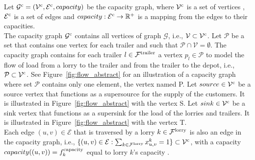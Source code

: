 Let
$\mathcal G^{\rm c} = ( \mathcal V^{\rm c},\mathcal E^{\rm c}, capacity)$
be the capacity graph, where
$\mathcal V^{\rm c}$
is a set of vertices ,
$\mathcal E^{\rm c}$
is a set of edges
and
$capacity : \mathcal E^{\rm c} \rightarrow \mathbb{R}^+ $
is a mapping from the edges to their capacities.\\

The capacity graph $\mathcal G^{\rm c}$ contains all vertices of graph $\mathcal G$, i.e., $  \mathcal V \subset \mathcal V^{\rm c}$.
%
Let $\mathcal P$  be a set that contains one vertex for each trailer and such that $\mathcal P \cap \mathcal V = \emptyset $.
The capacity graph contains
for each trailer
$l \in \mathcal F^{\rm trailer} $
a vertex
$p_l \in \mathcal P $
to model the flow of load from a lorry to the trailer and from the trailer to the depot, i.e., $  \mathcal P \subset \mathcal V^{\rm c}$.
See Figure~\ref{fig:flow_abstract} for an illustration of a capacity graph where set $\mathcal P$ contains only one element, the vertex named  P.
%
Let $source \in \mathcal V^{\rm c} $ be a source vertex that functions as a supersource for the supply of the customers.
It is illustrated in  Figure~\ref{fig:flow_abstract} with the vertex S.
Let $sink \in \mathcal V^{\rm c}$ be a sink vertex that functions as a supersink for  the load of the lorries and trailers.
 It is illustrated in  Figure~\ref{fig:flow_abstract} with the vertex T. \\





Each edge $ (u,v) \in \mathcal E$ that is traversed by a lorry $k \in \mathcal F^{\rm lorry}$ is also an edge in the capacity graph, i.e.,
  $ \{ (u,v) \in \mathcal E : \sum_{k \in \mathcal F^{\rm lorry}} x^k_{u,v} = 1 \} \subset \mathcal V^{\rm c} $,
with a capacity  $capacity((u,v)) = f^{\rm capacity}_k$ equal to lorry $k$'s capacity  .
\\



